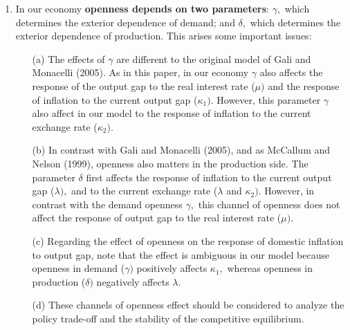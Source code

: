 \documentclass{article}
\begin{document}
\begin{enumerate}
\item In our economy \textbf{openness depends on two parameters}: $\gamma ,$
which determines the exterior dependence of demand; and $\delta ,$ which
determines the exterior dependence of production. This arises some important
issues:

\begin{itemize}
\item[(a)] The effects of $\gamma $ are different to the original model of
Gali and Monacelli (2005). As in this paper, in our economy $\gamma $ also
affects the response of the output gap to the real interest rate ($\mu )$
and the response of inflation to the current output gap ($\kappa _{1}).$
However, this parameter $\gamma $ also affect in our model to the response
of inflation to the current exchange rate ($\kappa _{2}).$

\item[(b)] In contrast with Gali and Monacelli (2005), and as McCallum and
Nelson (1999), openness also matters in the production side. The parameter $%
\delta $ first affects the response of inflation to the current output gap ($%
\lambda ),$ and to the current exchange rate ($\lambda $ and $\kappa _{2}).$
However, in contrast with the demand openness $\gamma ,$ this channel of
openness does not affect the response of output gap to the real interest
rate ($\mu ).$

\item[(c)] Regarding the effect of openness on the response of domestic
inflation to output gap, note that the effect is ambiguous in our model
because openness in demand ($\gamma )$ positively affects $\kappa _{1},$
whereas openness in production ($\delta )$ negatively affects $\lambda .$

\item[(d)] These channels of openness effect should be considered to analyze
the policy trade-off and the stability of the competitive equilibrium.
\end{itemize}


\end{enumerate}
\end{document}

